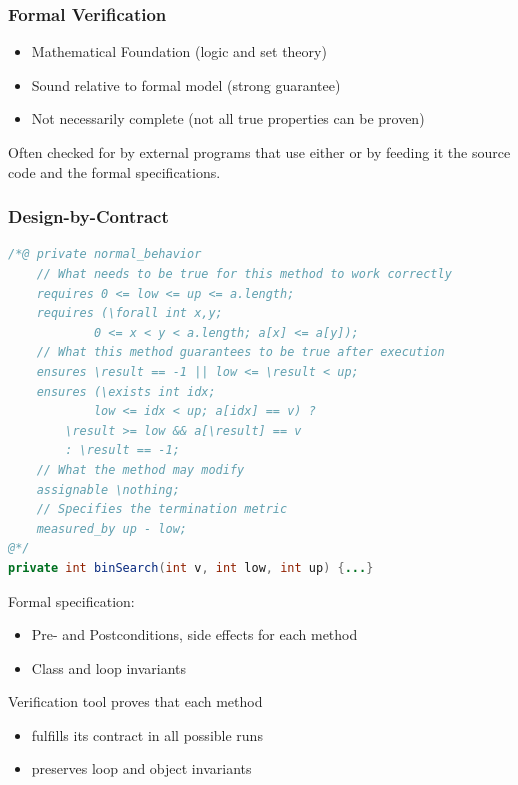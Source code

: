 \documentclass[
    ../../Software_Engineering_Summary.tex,
]
{subfiles}
\begin{document}
\begin{samepage}
\subsubsection{Formal Verification}

\begin{defbox}
    \begin{itemize}
        \item Mathematical Foundation (logic and set theory)
        \item Sound relative to formal model (strong guarantee)
        \item Not necessarily complete (not all true properties can be proven)
    \end{itemize}
\end{defbox}

Often checked for by external programs that use either  or  by feeding it the source code and the formal specifications.
\end{samepage}

\begin{samepage}
\subsubsection{Design-by-Contract}
\begin{codebox}
    \begin{lstlisting}[firstnumber=1,language=Java]
/*@ private normal_behavior
    // What needs to be true for this method to work correctly
    requires 0 <= low <= up <= a.length;
    requires (\forall int x,y;
            0 <= x < y < a.length; a[x] <= a[y]);
    // What this method guarantees to be true after execution
    ensures \result == -1 || low <= \result < up;
    ensures (\exists int idx;
            low <= idx < up; a[idx] == v) ?
        \result >= low && a[\result] == v
        : \result == -1;
    // What the method may modify
    assignable \nothing;
    // Specifies the termination metric
    measured_by up - low;
@*/
private int binSearch(int v, int low, int up) {...}
\end{lstlisting}
\end{codebox}
\end{samepage}
\begin{defbox}
    Formal specification:
    \begin{itemize}
        \item Pre- and Postconditions, side effects for each method
        \item Class and loop invariants
    \end{itemize}

    Verification tool proves that each method
    \begin{itemize}
        \item fulfills its contract in all possible runs
        \item preserves loop and object invariants
    \end{itemize}
\end{defbox}
\end{document}
